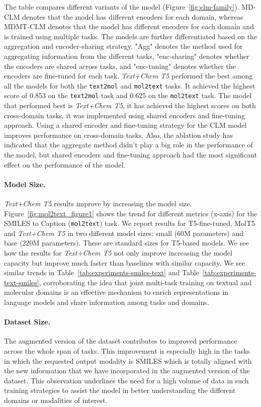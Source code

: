 \documentclass[nohyperref]{article}
\theoremstyle{plain}
\theoremstyle{definition}
\theoremstyle{remark}
\begin{document}
The table compares different variants of the model (Figure~\ref{fig:clm-family}). MD-CLM denotes that the model has different encoders for each domain, whereas MDMT-CLM denotes that the model has different encoders for each domain and is trained using multiple tasks. The models are further differentiated based on the aggregation and encoder-sharing strategy. "Agg" denotes the method used for aggregating information from the different tasks, "enc-sharing" denotes whether the encoders are shared across tasks, and "enc-tuning" denotes whether the encoders are fine-tuned for each task.
\emph{Text+Chem T5}  performed the best among all the models for both the \texttt{text2mol} and \texttt{mol2text} tasks. It achieved the highest score of 0.853 on the \texttt{text2mol} task and 0.625 on the \texttt{mol2text} task.
The model that performed best is\textit{ Text+Chem T5}, it has achieved the highest scores on both cross-domain tasks, it was implemented using shared encoders and fine-tuning approach.
Using a shared encoder and fine-tuning strategy for the CLM model improves performance on cross-domain tasks. Also, the ablation study has indicated that the aggregate method didn't play a big role in the performance of the model, but shared encoders and fine-tuning approach had the most significant effect on the performance of the model.

\paragraph{Model Size.}
\emph{Text+Chem T5}  results improve by increasing the model size.
Figure~\ref{fig:mol2text_figure1} shows the trend for different metrics (x-axis) for the SMILES to Caption (\texttt{mol2text}) task. 
We report results for T5-fine-tuned, MolT5 and \emph{Text+Chem T5}  in two different model sizes: small (60M parameters) and base (220M parameters). These are standard sizes for T5-based models.
We see how the results for \emph{Text+Chem T5}  not only improve increasing the model capacity but improve much faster than baselines with similar capacity. We see similar trends in Table~\ref{tab:experiments-smiles-text} and Table~\ref{tab:experiments-text-smiles}, corroborating the idea that joint multi-task training on textual and molecular domains is an effective mechanism to enrich representations in language models and share information among tasks and domains.

\paragraph{Dataset Size.}
The augmented version of the dataset contributes to improved performance across the whole span of tasks. This improvement is especially high in the tasks in which the requested output modality is SMILES which is totally aligned with the new information that we have incorporated in the augmented version of the dataset. This observation underlines the need for a high volume of data in such training strategies to assist the model in better understanding the different domains or modalities of interest. 
\end{document}
